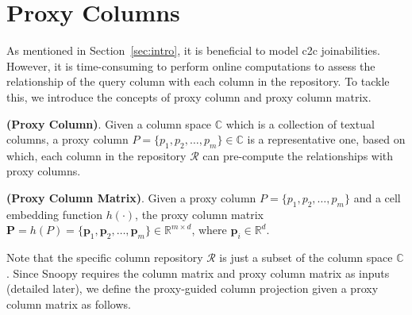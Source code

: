 \section{Proxy Columns}
\label{sec:pivot}
As mentioned in Section~\ref{sec:intro}, it is beneficial to model c2c  joinabilities. However, it is time-consuming to perform online computations to assess the relationship of the query column with each column in the repository. To tackle this, we introduce the concepts of proxy column and proxy column matrix.

\begin{myDef}
\textnormal{\textbf{(Proxy Column)}}. Given a column space $\mathbb{C}$ which is a collection of textual columns, a proxy column $P = \{p_1, p_2, \dots, p_m \} \in \mathbb{C}$ is a representative one, based on which, each column in the repository $\mathcal{R}$ can pre-compute the relationships with proxy columns. 
\end{myDef}



\begin{myDef}
\textnormal{\textbf{(Proxy Column Matrix)}}. Given a proxy column $P = \{p_1, p_2, \dots, p_m \}$ and a cell embedding function $h(\cdot)$, the proxy column matrix $\mathbf{P} = h (P) = \{\mathbf{p}_1, \mathbf{p}_2, \dots, \mathbf{p}_m \} \in \mathbb{R}^{m \times d}$, where $\mathbf{p}_i \in \mathbb{R}^d$. 
\end{myDef}

Note that the specific column repository $\mathcal{R}$ is just a subset of the column space $\mathbb{C}$.  Since \textsf{Snoopy} requires the column matrix and proxy column matrix as inputs (detailed later), we define the proxy-guided column projection given a proxy column matrix as follows.


